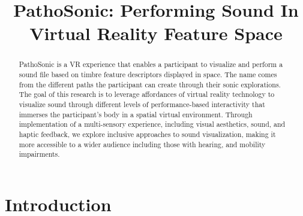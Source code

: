\documentclass{nime-alternate}
\begin{document}
\title{PathoSonic: Performing Sound In Virtual Reality Feature Space}

\maketitle

\begin{abstract}

PathoSonic is a VR experience that enables a participant to visualize and perform a sound file based on timbre feature descriptors displayed in space. The name comes from the different paths the participant can create through their sonic explorations. The goal of this research is to leverage affordances of virtual reality technology to visualize sound through different levels of performance-based interactivity that immerses the participant's body in a spatial virtual environment. Through implementation of a multi-sensory experience, including visual aesthetics, sound, and haptic feedback, we explore inclusive approaches to sound visualization, making it more accessible to a wider audience including those with hearing, and mobility impairments. 

\end{abstract}

\section{Introduction}
\end{document}
